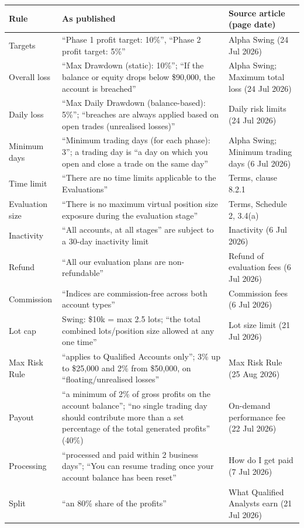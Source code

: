 \documentclass[11pt]{article}
\begin{document}
\begin{longtable}{L{3.0cm}L{8.2cm}L{3.6cm}}
\toprule
Rule & As published & Source article (page date)\\
\midrule
\endhead
Targets & ``Phase 1 profit target: 10\%'', ``Phase 2 profit target: 5\%'' & Alpha Swing (24 Jul 2026)\\
Overall loss & ``Max Drawdown (static): 10\%''; ``If the balance or equity drops below \$90,000, the account is breached'' & Alpha Swing; Maximum total loss (24 Jul 2026)\\
Daily loss & ``Max Daily Drawdown (balance-based): 5\%''; ``breaches are always applied based on open trades (unrealised losses)'' & Daily risk limits (24 Jul 2026)\\
Minimum days & ``Minimum trading days (for each phase): 3''; a trading day is ``a day on which you open and close a trade on the same day'' & Alpha Swing; Minimum trading days (6 Jul 2026)\\
Time limit & ``There are no time limits applicable to the Evaluations'' & Terms, clause 8.2.1\\
Evaluation size & ``There is no maximum virtual position size exposure during the evaluation stage'' & Terms, Schedule 2, 3.4(a)\\
Inactivity & ``All accounts, at all stages'' are subject to a 30-day inactivity limit & Inactivity (6 Jul 2026)\\
Refund & ``All our evaluation plans are non-refundable'' & Refund of evaluation fees (6 Jul 2026)\\
Commission & ``Indices are commission-free across both account types'' & Commission fees (6 Jul 2026)\\
Lot cap & Swing: \$10k = max 2.5 lots; ``the total combined lots/position size allowed at any one time'' & Lot size limit (21 Jul 2026)\\
Max Risk Rule & ``applies to Qualified Accounts only''; 3\% up to \$25,000 and 2\% from \$50,000, on ``floating/unrealised losses'' & Max Risk Rule (25 Aug 2026)\\
Payout & ``a minimum of 2\% of gross profits on the account balance''; ``no single trading day should contribute more than a set percentage of the total generated profits'' (40\%) & On-demand performance fee (22 Jul 2026)\\
Processing & ``processed and paid within 2 business days''; ``You can resume trading once your account balance has been reset'' & How do I get paid (7 Jul 2026)\\
Split & ``an 80\% share of the profits'' & What Qualified Analysts earn (21 Jul 2026)\\

\end{longtable}
\end{document}
